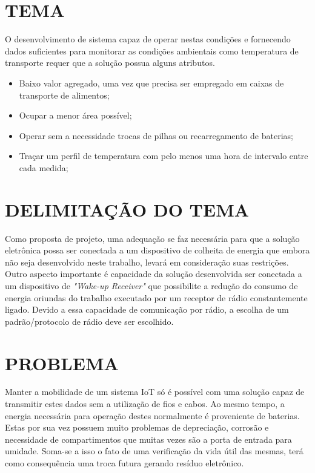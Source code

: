 \section{TEMA} 
O desenvolvimento de sistema capaz de operar nestas condições e fornecendo dados suficientes para monitorar as condições ambientais como temperatura de transporte requer que a solução possua alguns atributos.

\begin{itemize}
    \item Baixo valor agregado, uma vez que precisa ser empregado em caixas de transporte de alimentos;
    \item Ocupar a menor área possível;
    \item Operar sem a necessidade trocas de pilhas ou recarregamento de baterias;
    \item Traçar um perfil de temperatura com pelo menos uma hora de intervalo entre cada medida;
\end{itemize}
\section{DELIMITAÇÃO DO TEMA} 
Como proposta de projeto, uma adequação se faz necessária para que a solução eletrônica possa ser conectada a um dispositivo de colheita de energia que embora não seja desenvolvido neste trabalho, levará em consideração suas restrições. Outro aspecto importante é capacidade da solução desenvolvida ser conectada a um dispositivo de \textit{"Wake-up Receiver"} que possibilite a redução do consumo de energia oriundas do trabalho executado por um receptor de rádio constantemente ligado. Devido a essa capacidade de comunicação por rádio, a escolha de um padrão/protocolo de rádio deve ser escolhido.
\section{PROBLEMA}
Manter a mobilidade de um sistema IoT só é possível com uma solução capaz de transmitir estes dados sem a utilização de fios e cabos. Ao mesmo tempo, a energia necessária para operação destes normalmente é proveniente de baterias. Estas por sua vez possuem muito problemas de depreciação, corrosão e necessidade de compartimentos que muitas vezes são a porta de entrada para umidade. Soma-se a isso o fato de uma verificação da vida útil das mesmas, terá como consequência uma troca futura gerando resíduo eletrônico.

